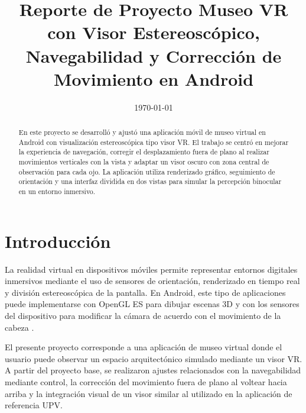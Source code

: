 \documentclass[conference]{IEEEtran}
\date{\specialdate\today}
\begin{document}
\title{Reporte de Proyecto Museo VR con Visor Estereoscópico, Navegabilidad y Corrección de Movimiento en Android}

\author{
}

\maketitle

\begin{abstract}
En este proyecto se desarrolló y ajustó una aplicación móvil de museo virtual en Android con visualización estereoscópica tipo visor VR. El trabajo se centró en mejorar la experiencia de navegación, corregir el desplazamiento fuera de plano al realizar movimientos verticales con la vista y adaptar un visor oscuro con zona central de observación para cada ojo. La aplicación utiliza renderizado gráfico, seguimiento de orientación y una interfaz dividida en dos vistas para simular la percepción binocular en un entorno inmersivo.
\end{abstract}

\section{Introducción}

La realidad virtual en dispositivos móviles permite representar entornos digitales inmersivos mediante el uso de sensores de orientación, renderizado en tiempo real y división estereoscópica de la pantalla. En Android, este tipo de aplicaciones puede implementarse con OpenGL ES para dibujar escenas 3D y con los sensores del dispositivo para modificar la cámara de acuerdo con el movimiento de la cabeza \cite{androidopengl,androidsensors}.

El presente proyecto corresponde a una aplicación de museo virtual donde el usuario puede observar un espacio arquitectónico simulado mediante un visor VR. A partir del proyecto base, se realizaron ajustes relacionados con la navegabilidad mediante control, la corrección del movimiento fuera de plano al voltear hacia arriba y la integración visual de un visor similar al utilizado en la aplicación de referencia UPV.
\end{document}
